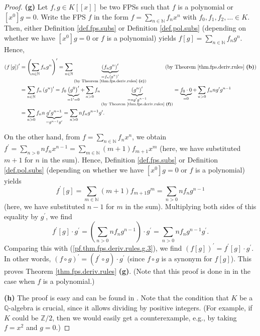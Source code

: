 \begin{proof}
\textbf{(g)} Let $f,g\in K\left[  \left[  x\right]  \right]  $ be two FPSs
such that $f$ is a polynomial or $\left[  x^{0}\right]  g=0$. Write the FPS
$f$ in the form $f=\sum_{n\in\mathbb{N}}f_{n}x^{n}$ with $f_{0},f_{1}%
,f_{2},\ldots\in K$. Then, either Definition \ref{def.fps.subs} or Definition
\ref{def.pol.subs} (depending on whether we have $\left[  x^{0}\right]  g=0$
or $f$ is a polynomial) yields $f\left[  g\right]  =\sum_{n\in\mathbb{N}}%
f_{n}g^{n}$. Hence,%
\begin{align}
\left(  f\left[  g\right]  \right)  ^{\prime}  &  =\left(  \sum_{n\in
\mathbb{N}}f_{n}g^{n}\right)  ^{\prime}=\sum_{n\in\mathbb{N}}%
\underbrace{\left(  f_{n}g^{n}\right)  ^{\prime}}_{\substack{=f_{n}\left(
g^{n}\right)  ^{\prime}\\\text{(by Theorem \ref{thm.fps.deriv.rules}
\textbf{(c)})}}}\ \ \ \ \ \ \ \ \ \ \left(  \text{by Theorem
\ref{thm.fps.deriv.rules} \textbf{(b)}}\right) \nonumber\\
&  =\sum_{n\in\mathbb{N}}f_{n}\left(  g^{n}\right)  ^{\prime}=f_{0}%
\underbrace{\left(  g^{0}\right)  ^{\prime}}_{=1^{\prime}=0}+\sum_{n>0}%
f_{n}\underbrace{\left(  g^{n}\right)  ^{\prime}}_{\substack{=ng^{\prime
}g^{n-1}\\\text{(by Theorem \ref{thm.fps.deriv.rules} \textbf{(f)})}%
}}=\underbrace{f_{0}\cdot0}_{=0}+\sum_{n>0}f_{n}ng^{\prime}g^{n-1}\nonumber\\
&  =\sum_{n>0}f_{n}n\underbrace{g^{\prime}g^{n-1}}_{=g^{n-1}g^{\prime}}%
=\sum_{n>0}nf_{n}g^{n-1}g^{\prime}. \label{pf.thm.fps.deriv.rules.g.3}%
\end{align}


On the other hand, from $f=\sum_{n\in\mathbb{N}}f_{n}x^{n}$, we obtain
$f^{\prime}=\sum_{n>0}nf_{n}x^{n-1}=\sum_{m\in\mathbb{N}}\left(  m+1\right)
f_{m+1}x^{m}$ (here, we have substituted $m+1$ for $n$ in the sum). Hence,
Definition \ref{def.fps.subs} or Definition \ref{def.pol.subs} (depending on
whether we have $\left[  x^{0}\right]  g=0$ or $f$ is a polynomial) yields
\[
f^{\prime}\left[  g\right]  =\sum_{m\in\mathbb{N}}\left(  m+1\right)
f_{m+1}g^{m}=\sum_{n>0}nf_{n}g^{n-1}%
\]
(here, we have substituted $n-1$ for $m$ in the sum). Multiplying both sides
of this equality by $g^{\prime}$, we find%
\[
f^{\prime}\left[  g\right]  \cdot g^{\prime}=\left(  \sum_{n>0}nf_{n}%
g^{n-1}\right)  \cdot g^{\prime}=\sum_{n>0}nf_{n}g^{n-1}g^{\prime}.
\]
Comparing this with (\ref{pf.thm.fps.deriv.rules.g.3}), we find $\left(
f\left[  g\right]  \right)  ^{\prime}=f^{\prime}\left[  g\right]  \cdot
g^{\prime}$. In other words, $\left(  f\circ g\right)  ^{\prime}=\left(
f^{\prime}\circ g\right)  \cdot g^{\prime}$ (since $f\circ g$ is a synonym for
$f\left[  g\right]  $). This proves Theorem \ref{thm.fps.deriv.rules}
\textbf{(g)}. (Note that this proof is done in \cite[proof of Theorem 7.57
(d)]{Loehr-BC} in the case when $f$ is a polynomial.) \medskip

\textbf{(h)} The proof is easy and can be found in \cite[Lemma 0.3]{logexp}.
Note that the condition that $K$ be a $\mathbb{Q}$-algebra is crucial, since
it allows dividing by positive integers. (For example, if $K$ could be
$\mathbb{Z}/2$, then we would easily get a counterexample, e.g., by taking
$f=x^{2}$ and $g=0$.)
\end{proof}
